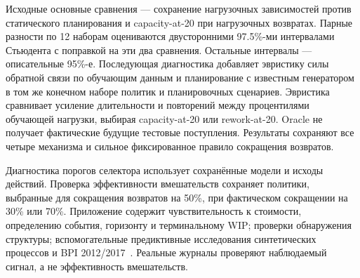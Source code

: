 Исходные основные сравнения — сохранение нагрузочных зависимостей против статического планирования и capacity-at-20 при нагрузочных возвратах. Парные разности по 12 наборам оцениваются двусторонними 97.5\%-ми интервалами Стьюдента с поправкой на эти два сравнения. Остальные интервалы — описательные 95\%-е. Последующая диагностика добавляет эвристику силы обратной связи по обучающим данным и планирование с известным генератором в том же конечном наборе политик и планировочных сценариев. Эвристика сравнивает усиление длительности и повторений между процентилями обучающей нагрузки, выбирая capacity-at-20 или rework-at-20. Oracle не получает фактические будущие тестовые поступления. Результаты сохраняют все четыре механизма и сильное фиксированное правило сокращения возвратов.

Диагностика порогов селектора использует сохранённые модели и исходы действий. Проверка эффективности вмешательств сохраняет политики, выбранные для сокращения возвратов на 50\%, при фактическом сокращении на 30\% или 70\%. Приложение содержит чувствительность к стоимости, определению события, горизонту и терминальному WIP; проверки обнаружения структуры; вспомогательные предиктивные исследования синтетических процессов и BPI 2012/2017~\cite{bpi12,bpi17}. Реальные журналы проверяют наблюдаемый сигнал, а не эффективность вмешательств.


